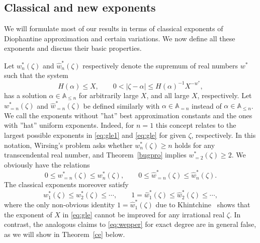 \documentclass[12pt]{amsart}
\theoremstyle{definition}
\begin{document}
\subsection{Classical and new exponents}  \label{bounded}
We will formulate most of our results in terms of classical exponents of Diophantine approximation and certain variations.
We now define all these exponents and discuss their basic properties.

Let
$w_{n}^{\ast}(\zeta)$ and $\widehat{w}_{n}^{\ast}(\zeta)$ respectively denote the
supremum of real numbers $w^{\ast}$ such that the system
%
\begin{equation}  \label{eq:wgleichse}
H(\alpha) \leq X, \qquad  0<\vert \zeta-\alpha\vert \leq H(\alpha)^{-1}X^{-w^{\ast}},  
\end{equation}
%
has a solution $\alpha\in \mathbb{A}_{\leq n}$
for arbitrarily large $X$, and all large $X$, respectively. 
Let $w_{=n}^{\ast}(\zeta)$ and $\widehat{w}_{=n}^{\ast}(\zeta)$ be
defined similarly with $\alpha\in \mathbb{A}_{=n}$ instead of $\alpha\in \mathbb{A}_{\leq n}$. We call the exponents without ''hat''
best approximation constants and the ones with ''hat'' uniform
exponents. Indeed, for $n=1$ this concept relates to the largest
possible exponents in \eqref{eq:gle1} and \eqref{eq:gle} for 
given $\zeta$, respectively. 
In this notation, Wirsing's problem asks 
whether $w_{n}^{\ast}(\zeta)\geq n$ holds for any transcendental real number, and 
Theorem~\ref{bugpro} implies $w_{=2}^{\ast}(\zeta)\geq 2$.
We obviously have the relations
%
\begin{equation}   \label{eq:obviuos}
0\leq w_{=n}^{\ast}(\zeta)\leq w_{n}^{\ast}(\zeta), \qquad 0\leq \widehat{w}_{=n}^{\ast}(\zeta)\leq \widehat{w}_{n}^{\ast}(\zeta).
\end{equation}
%
The classical exponents moreover satisfy 
%
\begin{equation} \label{eq:wepper}
w_{1}^{\ast}(\zeta)\leq w_{2}^{\ast}(\zeta)\leq \cdots, 
\qquad 1=\widehat{w}_{1}^{\ast}(\zeta)\leq \widehat{w}_{2}^{\ast}(\zeta)\leq \cdots,
\end{equation}
%
where the only non-obvious identity $1=\widehat{w}_{1}^{\ast}(\zeta)$ 
due to Khintchine~\cite{kinn} shows that the exponent of $X$ in
\eqref{eq:gle} cannot be improved for
any irrational real $\zeta$.
In contrast, the analogous claims to \eqref{eq:wepper} for exact degree
are in general false, as we will show in Theorem~\ref{ce} below.
\end{document}

